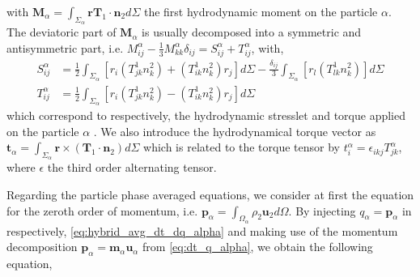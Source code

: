 with $\textbf{M}_\alpha = \int_{\Sigma_\alpha} \textbf{r}\mathbf{T}_1\cdot \textbf{n}_2d\Sigma $ the first hydrodynamic moment on the particle $\alpha$.
The deviatoric part of $\textbf{M}_\alpha$ is usually decomposed into a symmetric and antisymmetric part, i.e. $M^\alpha_{ij} - \frac{1}{3}M^\alpha_{kk}\delta_{ij} = S^\alpha_{ij}+T^\alpha_{ij}$, with,
\begin{align}
    \label{eq:M_decomposition}
    S^\alpha_{ij} 
    &= \frac{1}{2}  \int_{\Sigma_\alpha} \left[
        r_i(T^1_{jk}n^2_k)
        + (T^1_{ik}n^2_k)r_j
        \right]d\Sigma
        - \frac{\delta_{ij}}{3}\int_{\Sigma_\alpha} \left[
            r_l(T^1_{lk}n^2_k)
    \right]d\Sigma\\
    T^\alpha_{ij}
    &= \frac{1}{2}  \int_{\Sigma_\alpha} \left[
        r_i(T^1_{jk}n^2_k)
        - (T^1_{ik}n^2_k)r_j
    \right]d\Sigma \nonumber
\end{align}
which correspond  to respectively, the hydrodynamic stresslet and torque applied on the particle $\alpha$ \citep{guazzelli2011,kim2013microhydrodynamics}. 
We  also introduce the hydrodynamical torque vector as $\textbf{t}_\alpha = \int_{\Sigma_\alpha} \textbf{r} \times (\mathbf{T}_1\cdot \textbf{n}_2) d\Sigma$ which is related to the torque tensor by $t^\alpha_i = \epsilon_{ikj} T^\alpha_{jk}$, where $\epsilon$ the third order alternating tensor. 

Regarding the particle phase averaged equations, we consider at first the equation for the zeroth order of momentum, i.e. $\textbf{p}_\alpha = \int_{\Omega_\alpha} \rho_2 \textbf{u}_2 d\Omega$. 
By injecting $q_\alpha = \textbf{p}_\alpha$ in respectively, \ref{eq:hybrid_avg_dt_dq_alpha} and making use of the momentum decomposition $\textbf{p}_\alpha = \textbf{m}_\alpha \textbf{u}_\alpha$ from \ref{eq:dt_q_alpha},  we obtain the following equation,

